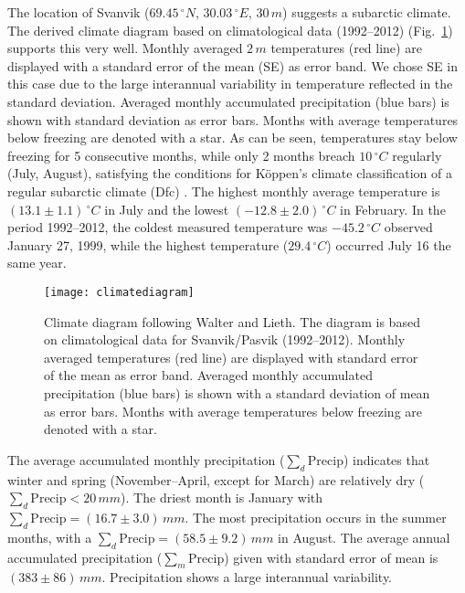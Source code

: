 \documentclass[bg, manuscript]{copernicus}
\begin{document}
The location of Svanvik ($69.45\,\unit{^\circ N}$, $30.03\,\unit{^\circ E}$, $30\,\unit{m}$) suggests a subarctic climate. The derived climate diagram based on climatological data (1992--2012) (Fig.~\ref{fig:climatediagram}) supports this very well. Monthly averaged $2\,\unit{m}$ temperatures (red line) are displayed with a standard error of the mean (SE) as error band. We chose SE in this case due to the large interannual variability in temperature reflected in the standard deviation. Averaged monthly accumulated precipitation (blue bars) is shown with standard deviation as error bars. Months with average temperatures below freezing are denoted with a star. As can be seen, temperatures stay below freezing for 5 consecutive months, while only 2 months breach $10\,\unit{^\circ C}$ regularly (July, August), satisfying the conditions for K\"{o}ppen's climate classification of a regular subarctic climate (Dfc) \citep[e.g.][]{SD:Beck2018}. The highest monthly average temperature is $(13.1\pm 1.1)\,\unit{^\circ C}$ in July and the lowest $(-12.8\pm 2.0)\,\unit{^\circ C}$ in February. In the period 1992--2012, the coldest measured temperature was $-45.2\,\unit{^\circ C}$ observed January 27, 1999, while the highest temperature ($29.4\,\unit{^\circ C}$) occurred July 16 the same year.

\begin{figure}[t]
  \texttt{[image: climatediagram]}
  \caption{Climate diagram following Walter and Lieth. The diagram is based on climatological data for Svanvik/Pasvik (1992--2012). Monthly averaged temperatures (red line) are displayed with standard error of the mean as error band. Averaged monthly accumulated precipitation (blue bars) is shown with a standard deviation of mean as error bars. Months with average temperatures below freezing are denoted with a star.}
  \label{fig:climatediagram}
\end{figure}

The average accumulated monthly precipitation ($\sum_d\mathrm{Precip}$) indicates that winter and spring (November--April, except for March) are relatively dry ($\sum_d\mathrm{Precip} < 20\,\unit{mm}$). The driest month is January with $\sum_d\mathrm{Precip} = (16.7\pm 3.0)\,\unit{mm}$. The most precipitation occurs in the summer months, with a $\sum_d\mathrm{Precip} = (58.5\pm 9.2)\,\unit{mm}$ in August. The average annual accumulated precipitation ($\sum_m\mathrm{Precip}$) given with standard error of mean is $(383\pm 86)\,\unit{mm}$. Precipitation shows a large interannual variability.
\end{document}
